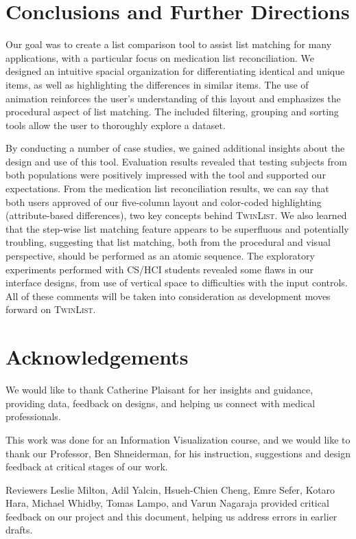 \documentclass{chi2009}
\newcommand{\TwinList}{\textsc{TwinList}}
\begin{document}
\section{Conclusions and Further Directions}
Our goal was to create a list comparison tool to assist list matching for many applications, with a particular focus on medication list reconciliation. We designed an intuitive spacial organization for differentiating identical and unique items, as well as highlighting the differences in similar items. The use of animation reinforces the user's understanding of this layout and emphasizes the procedural aspect of list matching. The included filtering, grouping and sorting tools allow the user to thoroughly explore a dataset.

By conducting a number of case studies, we gained additional insights about the design and use of this tool. Evaluation results revealed that testing subjects from both populations were positively impressed with the tool and supported our expectations. From the medication list reconciliation results, we can say that both users approved of our five-column layout and color-coded highlighting (attribute-based differences), two key concepts behind \TwinList. We also learned that the step-wise list matching feature appears to be superfluous and potentially troubling, suggesting that list matching, both from the procedural and visual perspective, should be performed as an atomic sequence. The exploratory experiments performed with CS/HCI students revealed some flaws in our interface designs, from use of vertical space to difficulties with the input controls. All of these comments will be taken into consideration as development moves forward on \TwinList.
 
\section{Acknowledgements}
We would like to thank Catherine Plaisant for her insights and guidance, providing data, feedback on designs, and helping us connect with medical professionals.

This work was done for an Information Visualization course, and we would like to thank our Professor, Ben Shneiderman, for his instruction, suggestions and design feedback at critical stages of our work.

Reviewers Leslie Milton, Adil Yalcin, Hsueh-Chien Cheng, Emre Sefer, Kotaro Hara, Michael Whidby, Tomas Lampo, and Varun Nagaraja provided critical feedback on our project and this document, helping us address errors in earlier drafts.
\end{document}
